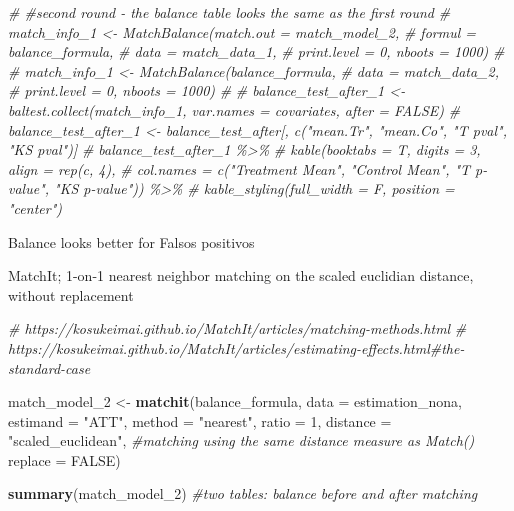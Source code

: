 \documentclass[
]{article}
\newenvironment{Shaded}{\begin{snugshade}}{\end{snugshade}}
\newcommand{\AttributeTok}[1]{\textcolor[rgb]{0.13,0.29,0.53}{#1}}
\newcommand{\CommentTok}[1]{\textcolor[rgb]{0.56,0.35,0.01}{\textit{#1}}}
\newcommand{\ConstantTok}[1]{\textcolor[rgb]{0.56,0.35,0.01}{#1}}
\newcommand{\DecValTok}[1]{\textcolor[rgb]{0.00,0.00,0.81}{#1}}
\newcommand{\FunctionTok}[1]{\textcolor[rgb]{0.13,0.29,0.53}{\textbf{#1}}}
\newcommand{\NormalTok}[1]{#1}
\newcommand{\OtherTok}[1]{\textcolor[rgb]{0.56,0.35,0.01}{#1}}
\newcommand{\StringTok}[1]{\textcolor[rgb]{0.31,0.60,0.02}{#1}}
\begin{document}
\begin{Shaded}
\begin{Highlighting}[]
\CommentTok{\# \#second round {-} the balance table looks the same as the first round}
\CommentTok{\# match\_info\_1 \textless{}{-} MatchBalance(match.out = match\_model\_2,}
\CommentTok{\#                                     formul = balance\_formula,}
\CommentTok{\#                                     data = match\_data\_1,}
\CommentTok{\#                                     print.level = 0, nboots = 1000)}
\CommentTok{\# }
\CommentTok{\# match\_info\_1 \textless{}{-} MatchBalance(balance\_formula,}
\CommentTok{\#                                     data = match\_data\_2,}
\CommentTok{\#                                     print.level = 0, nboots = 1000)}
\CommentTok{\# }
\CommentTok{\# balance\_test\_after\_1 \textless{}{-} baltest.collect(match\_info\_1, var.names = covariates, after = FALSE)}
\CommentTok{\# balance\_test\_after\_1 \textless{}{-} balance\_test\_after[, c("mean.Tr", "mean.Co", "T pval", "KS pval")]}
\CommentTok{\# balance\_test\_after\_1 \%\textgreater{}\%}
\CommentTok{\#   kable(booktabs = T, digits = 3, align = rep(\textquotesingle{}c\textquotesingle{}, 4),}
\CommentTok{\#         col.names = c("Treatment Mean", "Control Mean", "T p{-}value", "KS p{-}value")) \%\textgreater{}\% }
\CommentTok{\#   kable\_styling(full\_width = F, position = "center")}
\end{Highlighting}
\end{Shaded}

Balance looks better for Falsos positivos

MatchIt; 1-on-1 nearest neighbor matching on the scaled euclidian
distance, without replacement

\begin{Shaded}
\begin{Highlighting}[]
\CommentTok{\# https://kosukeimai.github.io/MatchIt/articles/matching{-}methods.html}
\CommentTok{\# https://kosukeimai.github.io/MatchIt/articles/estimating{-}effects.html\#the{-}standard{-}case}


\NormalTok{match\_model\_2 }\OtherTok{\textless{}{-}} \FunctionTok{matchit}\NormalTok{(balance\_formula, }
                         \AttributeTok{data =}\NormalTok{ estimation\_nona, }
                         \AttributeTok{estimand =} \StringTok{"ATT"}\NormalTok{,}
                         \AttributeTok{method =} \StringTok{"nearest"}\NormalTok{, }
                         \AttributeTok{ratio =} \DecValTok{1}\NormalTok{,}
                         \AttributeTok{distance =} \StringTok{"scaled\_euclidean"}\NormalTok{, }\CommentTok{\#matching using the same distance measure as Match()}
                         \AttributeTok{replace =} \ConstantTok{FALSE}\NormalTok{)}

\FunctionTok{summary}\NormalTok{(match\_model\_2) }\CommentTok{\#two tables: balance before and after matching}
\end{Highlighting}
\end{Shaded}
\end{document}
